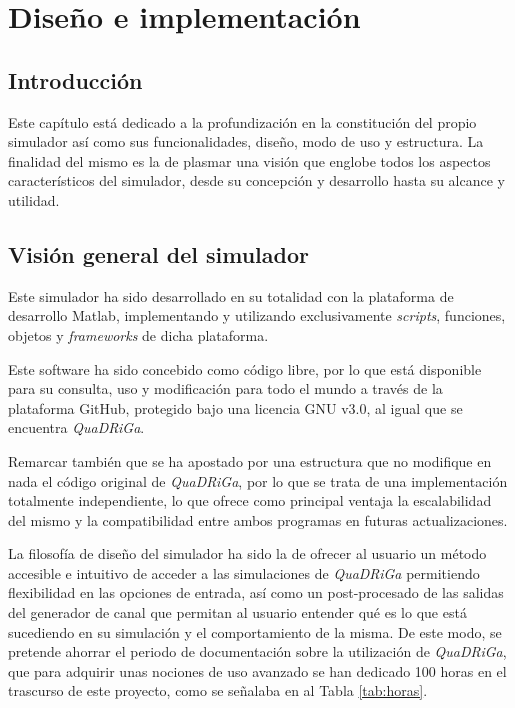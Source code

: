 \chapter{Diseño e implementación}\label{cap.implementacion}
\section{Introducción}

Este capítulo está dedicado a la profundización en la constitución del propio simulador así como sus funcionalidades, diseño, modo de uso y estructura. La finalidad del mismo es la de plasmar una visión que englobe todos los aspectos característicos del simulador, desde su concepción y desarrollo hasta su alcance y utilidad.

\section{Visión general del simulador}

Este simulador ha sido desarrollado en su totalidad con la plataforma de desarrollo Matlab, implementando y utilizando exclusivamente \textit{scripts}, funciones, objetos y \textit{frameworks} de dicha plataforma.

Este software ha sido concebido como código libre, por lo que está disponible para su consulta, uso y modificación para todo el mundo a través de la plataforma GitHub, protegido bajo una licencia GNU v3.0, al igual que se encuentra \textit{QuaDRiGa}.

Remarcar también que se ha apostado por una estructura que no modifique en nada el código original de \textit{QuaDRiGa}, por lo que se trata de una implementación totalmente independiente, lo que ofrece como principal ventaja la escalabilidad del mismo y la compatibilidad entre ambos programas en futuras actualizaciones.

La filosofía de diseño del simulador ha sido la de ofrecer al usuario un método accesible e intuitivo de acceder a las simulaciones de \textit{QuaDRiGa} permitiendo flexibilidad en las opciones de entrada, así como un post-procesado de las salidas del generador de canal que permitan al usuario entender qué es lo que está sucediendo en su simulación y el comportamiento de la misma. De este modo, se pretende ahorrar el periodo de documentación sobre la utilización de \textit{QuaDRiGa}, que para adquirir unas nociones de uso avanzado se han dedicado 100 horas en el trascurso de este proyecto, como se señalaba en al Tabla \ref{tab:horas}.

